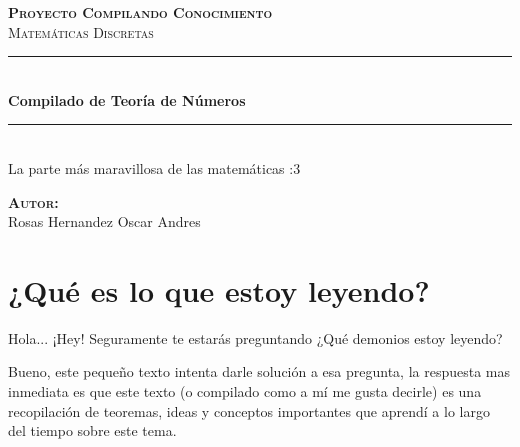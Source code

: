 \documentclass[12pt, fleqn]{report}                             %
\author{Oscar Andrés Rosas}                                     %
\begin{document}
\begin{titlepage}

    \center
    \textbf{\textsc{\Large Proyecto Compilando Conocimiento}}\\[1.0cm] 
    \textsc{\Large Matemáticas Discretas}\\[1.0cm] 

    \rule{\linewidth}{0.5mm} \\[1.0cm]
        { \huge \bfseries Compilado de Teoría de Números}\\[1.0cm] 
    \rule{\linewidth}{0.5mm} \\[2.0cm]
    
    {\LARGE La parte más maravillosa de las matemáticas :3}\\[7cm] 
    
    \begin{center} \large
    \textbf{\textsc{Autor:}}\\
       Rosas Hernandez Oscar Andres
    \end{center}

    \vfill

\end{titlepage}

\tableofcontents{}
\label{sec:Index}

\clearpage



\section{¿Qué es lo que estoy leyendo?}

    
    Hola... ¡Hey! Seguramente te estarás preguntando
    ¿Qué demonios estoy leyendo?

    Bueno, este pequeño texto intenta darle solución a esa pregunta, la respuesta mas inmediata es
    que este texto (o compilado como a mí me gusta decirle) es una recopilación de teoremas, ideas
    y conceptos importantes que aprendí a lo largo del tiempo sobre este tema.
\end{document}
